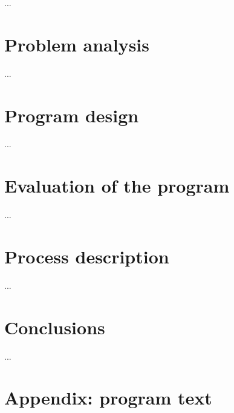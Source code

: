 \documentclass[a4paper]{report}
\begin{document}
...

\section{Problem analysis}

...

\section{Program design}

...

\section{Evaluation of the program}

...

%

\section{Process description}

...

\section{Conclusions}

...

\section{Appendix: program text}


% 

%

%
\end{document}
